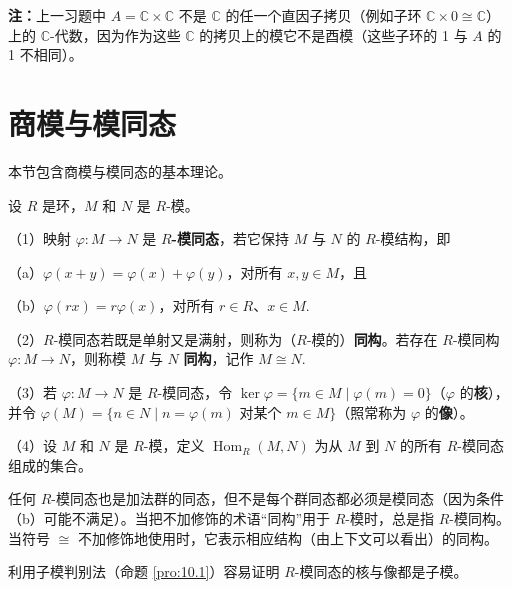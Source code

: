 \noindent\textbf{注：}上一习题中 \(A = \mathbb{C} \times \mathbb{C}\) 不是 \(\mathbb{C}\) 的任一个直因子拷贝（例如子环 \(\mathbb{C} \times 0 \cong \mathbb{C}\)）上的 \(\mathbb{C}\)-代数，因为作为这些 \(\mathbb{C}\) 的拷贝上的模它不是酉模（这些子环的 1 与 \(A\) 的 1 不相同）。

\section{商模与模同态}

本节包含商模与模同态的基本理论。

\begin{definition}
设 \(R\) 是环，\(M\) 和 \(N\) 是 \(R\)-模。

（1）映射 \(\varphi : M \to N\) 是 \textbf{\(R\)-模同态}，若它保持 \(M\) 与 \(N\) 的 \(R\)-模结构，即

（a）\(\varphi(x+y) = \varphi(x)+\varphi(y)\)，对所有 \(x, y \in M\)，且

（b）\(\varphi(rx) = r\varphi(x)\)，对所有 \(r \in R\)、\(x \in M\).

（2）\(R\)-模同态若既是单射又是满射，则称为（\(R\)-模的）\textbf{同构}。若存在 \(R\)-模同构 \(\varphi : M \to N\)，则称模 \(M\) 与 \(N\) \textbf{同构}，记作 \(M \cong N\).

（3）若 \(\varphi : M \to N\) 是 \(R\)-模同态，令 \(\ker\varphi = \{m \in M \mid \varphi(m) = 0\}\)（\(\varphi\) 的\textbf{核}），并令 \(\varphi(M) = \{n \in N \mid n = \varphi(m) \text{ 对某个 } m \in M\}\)（照常称为 \(\varphi\) 的\textbf{像}）。

（4）设 \(M\) 和 \(N\) 是 \(R\)-模，定义 \(\operatorname{Hom}_R(M, N)\) 为从 \(M\) 到 \(N\) 的所有 \(R\)-模同态组成的集合。
\end{definition}

任何 \(R\)-模同态也是加法群的同态，但不是每个群同态都必须是模同态（因为条件（b）可能不满足）。当把不加修饰的术语“同构”用于 \(R\)-模时，总是指 \(R\)-模同构。当符号 \(\cong\) 不加修饰地使用时，它表示相应结构（由上下文可以看出）的同构。

利用子模判别法（命题 \ref{pro:10.1}）容易证明 \(R\)-模同态的核与像都是子模。

